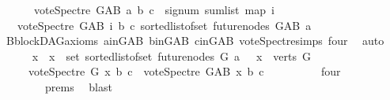 \begin{isabellebody}
\ \ \ \ \ \ {\isachardoublequoteopen}vote{\isacharunderscore}{\kern0pt}Spectre\ G{\isacharunderscore}{\kern0pt}AB\ a\ b\ c\ {\isacharequal}{\kern0pt}\ signum\ {\isacharparenleft}{\kern0pt}sum{\isacharunderscore}{\kern0pt}list\ {\isacharparenleft}{\kern0pt}map\ {\isacharparenleft}{\kern0pt}{\isasymlambda}i{\isachardot}{\kern0pt}\isanewline
\ \ \ {\isacharparenleft}{\kern0pt}vote{\isacharunderscore}{\kern0pt}Spectre\ G{\isacharunderscore}{\kern0pt}AB\ i\ b\ c{\isacharparenright}{\kern0pt}{\isacharparenright}{\kern0pt}\ {\isacharparenleft}{\kern0pt}sorted{\isacharunderscore}{\kern0pt}list{\isacharunderscore}{\kern0pt}of{\isacharunderscore}{\kern0pt}set\ {\isacharparenleft}{\kern0pt}future{\isacharunderscore}{\kern0pt}nodes\ G{\isacharunderscore}{\kern0pt}AB\ a{\isacharparenright}{\kern0pt}{\isacharparenright}{\kern0pt}{\isacharparenright}{\kern0pt}{\isacharparenright}{\kern0pt}{\isachardoublequoteclose}\isanewline
\ \ \ \ \ \ \isamarkupfalse%
\ B{}{\isachardot}{\kern0pt}blockDAG{\isacharunderscore}{\kern0pt}axioms\ a{\isacharunderscore}{\kern0pt}in{\isacharunderscore}{\kern0pt}G{\isacharunderscore}{\kern0pt}AB\ b{\isacharunderscore}{\kern0pt}in{\isacharunderscore}{\kern0pt}G{\isacharunderscore}{\kern0pt}AB\ c{\isacharunderscore}{\kern0pt}in{\isacharunderscore}{\kern0pt}G{\isacharunderscore}{\kern0pt}AB\ vote{\isacharunderscore}{\kern0pt}Spectre{\isachardot}{\kern0pt}simps\ four\ \isamarkupfalse%
\ auto\isanewline
\ \ \ \ \isamarkupfalse%
\ {\isachardoublequoteopen}{\isasymAnd}x\ {\isachardot}{\kern0pt}\ x\ {\isasymin}\ set\ {\isacharparenleft}{\kern0pt}sorted{\isacharunderscore}{\kern0pt}list{\isacharunderscore}{\kern0pt}of{\isacharunderscore}{\kern0pt}set\ {\isacharparenleft}{\kern0pt}future{\isacharunderscore}{\kern0pt}nodes\ G\ a{\isacharparenright}{\kern0pt}{\isacharparenright}{\kern0pt}\ {\isasymLongrightarrow}\ \ x\ {\isasymin}\ verts\ G\isanewline
\ \ \ \ {\isasymLongrightarrow}\ vote{\isacharunderscore}{\kern0pt}Spectre\ G\ x\ b\ c\ {\isasymle}\ vote{\isacharunderscore}{\kern0pt}Spectre\ G{\isacharunderscore}{\kern0pt}AB\ x\ b\ c{\isachardoublequoteclose}\ \isanewline
\ \ \ \ \ \ \isamarkupfalse%
\ {}{\isacharparenleft}{\kern0pt}{}{\isacharcomma}{\kern0pt}{}{\isacharparenright}{\kern0pt}\ four\isanewline
\ \ \ \ \ \ \ \ {\isachardoublequoteopen}{}{\isachardot}{\kern0pt}prems{\isachardoublequoteclose}{\isacharparenleft}{\kern0pt}{}{\isacharparenright}{\kern0pt}\ \isamarkupfalse%
\ blast\ \isanewline

\end{isabellebody}
